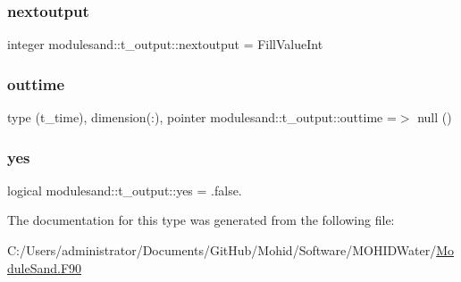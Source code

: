 \subsubsection{\texorpdfstring{nextoutput}{nextoutput}}
{\footnotesize\ttfamily integer modulesand\+::t\+\_\+output\+::nextoutput = Fill\+Value\+Int\hspace{0.3cm}{\ttfamily [private]}}

\mbox{\label{structmodulesand_1_1t__output_acdaace3b0a34256c2d98d937bad1023b}} 
\subsubsection{\texorpdfstring{outtime}{outtime}}
{\footnotesize\ttfamily type (t\+\_\+time), dimension(\+:), pointer modulesand\+::t\+\_\+output\+::outtime =$>$ null ()\hspace{0.3cm}{\ttfamily [private]}}

\mbox{\label{structmodulesand_1_1t__output_a858e3e9c68ac8050169ece7978058642}} 
\subsubsection{\texorpdfstring{yes}{yes}}
{\footnotesize\ttfamily logical modulesand\+::t\+\_\+output\+::yes = .false.\hspace{0.3cm}{\ttfamily [private]}}



The documentation for this type was generated from the following file\+:\begin{DoxyCompactItemize}
\item 
C\+:/\+Users/administrator/\+Documents/\+Git\+Hub/\+Mohid/\+Software/\+M\+O\+H\+I\+D\+Water/\mbox{\hyperlink{_module_sand_8_f90}{Module\+Sand.\+F90}}\end{DoxyCompactItemize}
